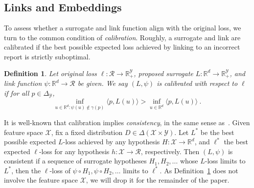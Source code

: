 \documentclass[12pt]{article}
\newcommand{\Comments}{1}
\newcommand{\mynote}[2]{\ifnum\Comments=1\textcolor{#1}{#2}\fi}
\newcommand{\mytodo}[2]{\ifnum\Comments=1%
  \todo[linecolor=#1!80!black,backgroundcolor=#1,bordercolor=#1!80!black]{#2}\fi}
\newcommand{\raf}[1]{\mynote{green}{[RF: #1]}}
\newcommand{\btw}[1]{}%
\newcommand{\reals}{\mathbb{R}}
\newcommand{\simplex}{\Delta_\Y}
\newcommand{\R}{\mathcal{R}}
\newcommand{\X}{\mathcal{X}}
\newcommand{\Y}{\mathcal{Y}}
\newcommand{\inprod}[2]{\langle #1, #2 \rangle}%
\newtheorem{definition}{Definition}
\begin{document}
\subsection{Links and Embeddings}

To assess whether a surrogate and link function align with the original loss, we turn to the common condition of \emph{calibration}.
Roughly, a surrogate and link are calibrated if the best possible expected loss achieved by linking to an incorrect report is strictly suboptimal.
\btw{Separated stuff commented out}



\begin{definition}
  \label{def:calibrated}
  Let original loss $\ell:\R\to\reals^\Y_+$, proposed surrogate $L:\reals^d\to\reals^\Y_+$, and link function $\psi:\reals^d\to\R$ be given.
  We say $(L,\psi)$ is \emph{calibrated} with respect to $\ell$ if
for all $p \in \simplex$,
  \begin{equation}
    \label{eq:calibrated}
  \inf_{u \in \reals^d : \psi(u) \not\in \gamma(p)} \inprod{p}{L(u)} > \inf_{u \in \reals^d} \inprod{p}{L(u)}~.
  \end{equation}
\end{definition}
It is well-known that calibration implies \emph{consistency}, in the same sense as~\citet{agarwal2015consistent}.
Given feature space $\X$, fix a fixed distribution $D \in \Delta(\X\times\Y)$.
Let $L^*$ be the best possible expected $L$-loss achieved by any hypothesis $H:\X\to\reals^d$, and $\ell^*$ the best expected $\ell$-loss for any hypothesis $h:\X\to\R$, respectively.
Then $(L,\psi)$ is consistent if a sequence of surrogate hypotheses $H_1,H_2,\ldots$ whose $L$-loss limits to $L^*$, then the $\ell$-loss of $\psi\circ H_1,\psi \circ H_2, \ldots$ limits to $\ell^*$.
As Definition~\ref{def:calibrated} does not involve the feature space $\X$, we will drop it for the remainder of the paper.
\end{document}
